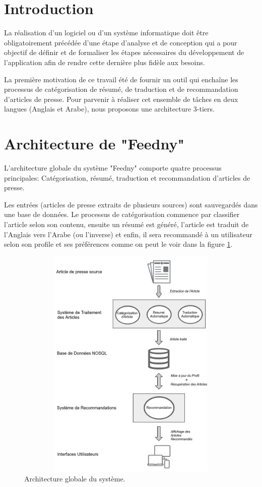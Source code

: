 
\newpage
\section{Introduction}
La réalisation d'un logiciel ou d'un système informatique doit être obligatoirement précédée d'une étape d'analyse et de conception qui a pour objectif de définir et de formaliser les étapes nécessaires du développement de l'application afin de rendre cette dernière plus fidèle aux besoins.

La première motivation de ce travail été de fournir un outil qui enchaîne les processus de catégorisation de résumé, de traduction et de recommandation d'articles de presse. Pour parvenir à réaliser cet ensemble de tâches en deux langues (Anglais et Arabe), nous proposons une architecture 3-tiers. 
\section{Architecture de "Feedny"}
L'architecture globale du système "Feedny" comporte quatre processus principales: Catégorisation, résumé, traduction et recommandation d'articles de presse.

Les entrées (articles de presse extraits de plusieurs sources) sont sauvegardés dans une base de données. Le processus de catégorisation commence par classifier l'article selon son contenu, ensuite un résumé est généré, l'article est traduit de l'Anglais vers l'Arabe (ou l'inverse) et enfin, il sera recommandé à un utilisateur selon son profile et ses préférences comme on peut le voir dans la figure \ref{shemaglobal}.

\begin{figure}[H]
    \centering
    \includegraphics[height=320pt,width=330pt]{img/chapter3/global.png}
    \caption{Architecture globale du système.}
    \label{shemaglobal}
\end{figure}

